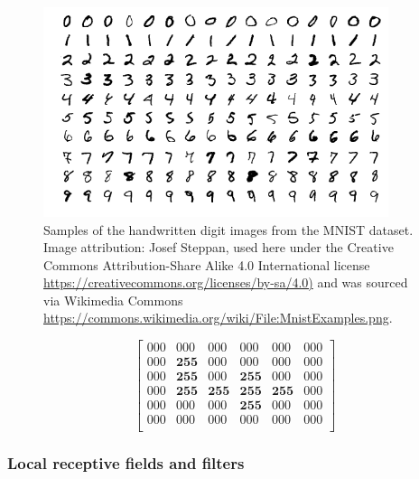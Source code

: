 \documentclass[xcolor={table}]{beamer}
\begin{document}
 \begin{frame} 
\begin{figure}[t]
\centerline{
\includegraphics[width=0.9\textwidth]{./images/fmlpda_8_30.png}
}
\caption[Samples of the handwritten digit images from the MNIST dataset.]{Samples of the handwritten digit images from the MNIST dataset. Image attribution: Josef Steppan, used here under the Creative Commons Attribution-Share Alike 4.0 International license \url{https://creativecommons.org/licenses/by-sa/4.0)} and was sourced via Wikimedia Commons \url{https://commons.wikimedia.org/wiki/File:MnistExamples.png}.}
\label{fig:mnistsamples}
\end{figure}
\end{frame} 



 \begin{frame} 
\begin{equation}
\begin{bmatrix}
000 & 000 & 000 & 000 & 000 & 000\\
000 & \mathbf{255} & 000 & 000 & 000 & 000\\
000 & \mathbf{255} & 000 & \mathbf{255} & 000 & 000\\
000 & \mathbf{255} & \mathbf{255} & \mathbf{255} & \mathbf{255} & 000\\
000 & 000 & 000 & \mathbf{255} & 000 & 000\\
000 & 000 & 000 & 000 & 000 & 000\\
\end{bmatrix}
\label{eq:digit4matrix}
\end{equation}
\end{frame} 


\subsubsection{Local receptive fields and filters}
\end{document}
